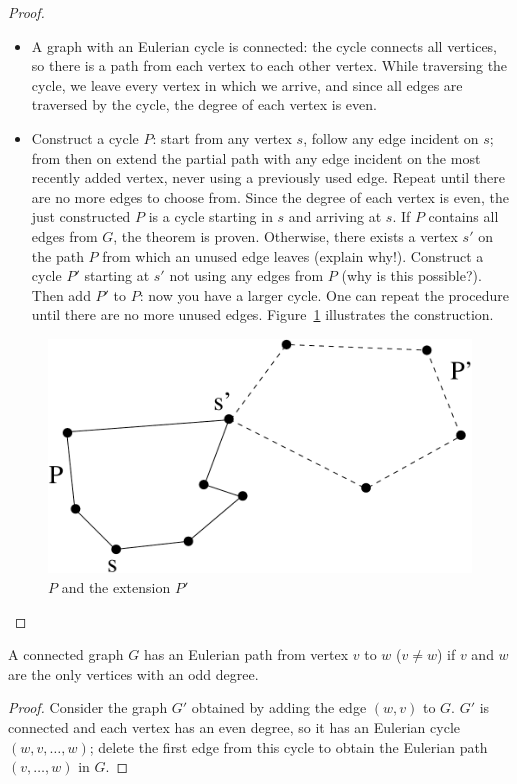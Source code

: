 \begin{proof}

\begin{itemize}
\item A graph with an Eulerian cycle is connected: the cycle connects
all vertices, so there is a path from each vertex to each other
vertex. While traversing the cycle, we leave every vertex in which we
arrive, and since all edges are traversed by the cycle, the degree of
each vertex is even.

\item Construct a cycle $P$: start from any vertex $s$, follow any
edge incident on $s$; from then on extend the partial path with any
edge incident on the most recently added vertex, never using a
previously used edge. Repeat until there are no more edges to choose
from. Since the degree of each vertex is even, the just constructed
$P$ is a cycle starting in $s$ and arriving at $s$. If $P$ contains
all edges from $G$, the theorem is proven. Otherwise, there exists a
vertex $s'$ on the path $P$ from which an unused edge leaves (explain
why!). Construct a cycle $P'$ starting at $s'$ not using any edges
from $P$ (why is this possible?). Then add $P'$ to $P$: now you have a
larger cycle. One can repeat the procedure until there are no more
unused edges. Figure~\ref{euler4} illustrates the construction.
\end{itemize}
\begin{figure}[ht]
\begin{center}
\includegraphics[width=0.4\linewidth,keepaspectratio]{euler4}
\end{center}
\caption{ $P$ and the extension $P'$ \label{euler4}}
\end{figure}
\end{proof}


\begin{theorem}
  A connected graph $G$ has an Eulerian path from vertex $v$ to $w$
  ($v \neq w$) if $v$ and $w$ are the only vertices with an odd degree.
\end{theorem}
\begin{proof}
Consider the graph $G'$ obtained by adding the edge $(w,v)$ to $G$.
$G'$ is connected and each vertex has an even degree, so it has an
Eulerian cycle $(w,v,\ldots,w)$; delete the first edge from this cycle
to obtain the Eulerian path $(v,\ldots,w)$ in $G$.
\end{proof}

